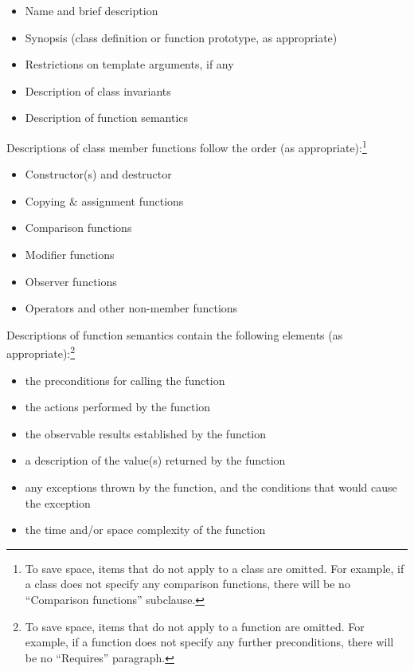 \begin{itemize}
\item Name and brief description
\item Synopsis (class definition or function prototype, as appropriate)
\item Restrictions on template arguments, if any
\item Description of class invariants
\item Description of function semantics
\end{itemize}

\pnum
Descriptions of class member functions follow the order (as
appropriate):\footnote{To save space, items that do not apply to a class are omitted.
For example, if a class does not specify any comparison functions, there
will be no ``Comparison functions'' subclause.}

\begin{itemize}
\item Constructor(s) and destructor
\item Copying \& assignment functions
\item Comparison functions
\item Modifier functions
\item Observer functions
\item Operators and other non-member functions
\end{itemize}

\pnum
Descriptions of function semantics contain the following elements (as
appropriate):\footnote{To save space, items that do not apply to a function are omitted.
For example, if a function does not specify any
further
preconditions, there will be no ``Requires'' paragraph.}

\begin{itemize}
\item \requires the preconditions for calling the function
\item \effects the actions performed by the function
\item \postconditions the observable results established by the function
\item \returns a description of the value(s) returned by the function
\item \throws any exceptions thrown by the function, and the conditions that would cause the exception
\item \complexity the time and/or space complexity of the function
\end{itemize}

